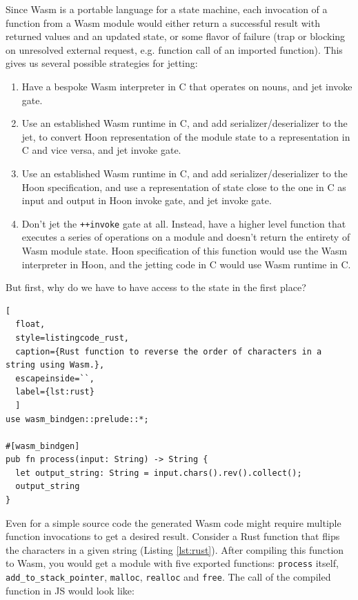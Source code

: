 \documentclass[twoside]{article}
\begin{document}
Since Wasm is a portable language for a state machine, each invocation of a function from a Wasm module would either return a successful result with returned values and an updated state, or some flavor of failure (trap or blocking on unresolved external request, e.g. function call of an imported function). This gives us several possible strategies for jetting:

\begin{enumerate}
  \item  Have a bespoke Wasm interpreter in C that operates on nouns, and jet invoke gate.
  \item  Use an established Wasm runtime in C, and add serializer/deserializer to the jet, to convert Hoon representation of the module state to a representation in C and vice versa, and jet invoke gate.
  \item  Use an established Wasm runtime in C, and add serializer/deserializer to the Hoon specification, and use a representation of state close to the one in C as input and output in Hoon invoke gate, and jet invoke gate.
  \item  Don't jet the \lstinline[style=inlinecode]{++invoke} gate at all. Instead, have a higher level function that executes a series of operations on a module and doesn't return the entirety of Wasm module state. Hoon specification of this function would use the Wasm interpreter in Hoon, and the jetting code in C would use Wasm runtime in C.
\end{enumerate}

\noindent
But first, why do we have to have access to the state in the first place?

\begin{lstlisting}[
  float,
  style=listingcode_rust,
  caption={Rust function to reverse the order of characters in a string using Wasm.},
  escapeinside=``,
  label={lst:rust}
  ]
use wasm_bindgen::prelude::*;

#[wasm_bindgen]
pub fn process(input: String) -> String {
  let output_string: String = input.chars().rev().collect();
  output_string
}
\end{lstlisting}

Even for a simple source code the generated Wasm code might require multiple function invocations to get a desired result. Consider a Rust function that flips the characters in a given string (Listing \ref{lst:rust}).  After compiling this function to Wasm, you would get a module with five exported functions: \lstinline[style=inlinecode]{process} itself, \lstinline[style=inlinecode]{add_to_stack_pointer}, \lstinline[style=inlinecode]{malloc}, \lstinline[style=inlinecode]{realloc} and \lstinline[style=inlinecode]{free}.  The call of the compiled function in JS would look like:
\end{document}
